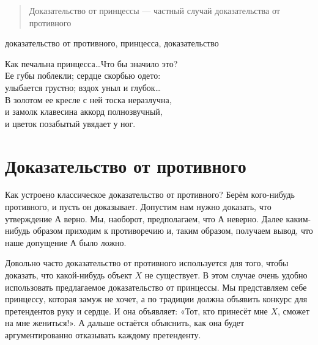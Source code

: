 \documentclass[10pt]{article}
\begin{document}


\DoFirstPageTechnicalStuff


\newtheorem{theorem}{Теорема}
\newtheorem{definition}{Определение}

\begin{abstract}
Доказательство от принцессы --- частный случай доказательства от противного
\end{abstract}

\begin{keyword}
доказательство от противного, принцесса, доказательство
\end{keyword}

\newcommand{\attrib}[1]{\nopagebreak\noindent
  \makebox[\dimexpr(\versewidth)][r]{\footnotesize#1}}

\settowidth{}

\begin{flushright}
\parbox{\versewidth}{
Как печальна принцесса\ldots Что бы значило это? \\
Ее губы поблекли; сердце скорбью одето:  \\
улыбается грустно; вздох уныл и глубок\ldots \\
В золотом ее кресле с ней тоска неразлучна, \\
и замолк клавесина аккорд полнозвучный, \\
и цветок позабытый увядает у ног.  \\
\attrib{Сонатина, Рубен Дарио}
}
\end{flushright}




\section{Доказательство от противного}

Как устроено классическое доказательство от противного? Берём кого-нибудь противного, и пусть он доказывает. Допустим нам нужно доказать, что утверждение А верно. Мы, наоборот, предполагаем, что А неверно. Далее каким-нибудь образом приходим к противоречию и, таким образом, получаем вывод, что наше допущение А было ложно.

Довольно часто доказательство от противного используется для того, чтобы доказать, что какой-нибудь объект $X$ не существует. В этом случае очень удобно использовать предлагаемое доказательство от принцессы. Мы представляем себе принцессу, которая замуж не хочет, а по традиции должна объявить конкурс для претендентов руку и сердце. И она объявляет: «Тот, кто принесёт мне $X$, сможет на мне жениться!». А дальше остаётся объяснить, как она будет аргументированно отказывать каждому претенденту.
\end{document}

